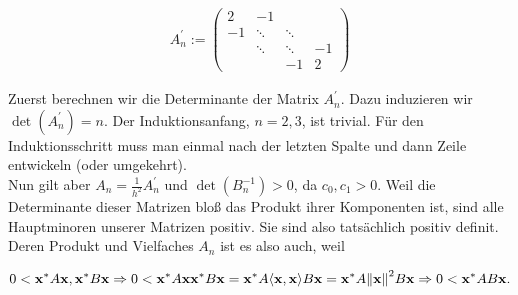 \begin{align*}
  A_n^\prime :=
  \begin{pmatrix}
     2 &  -1     &        &    \\
    -1 &  \ddots & \ddots &    \\
       &  \ddots & \ddots & -1 \\
       &         & -1     &  2
  \end{pmatrix}
\end{align*}

Zuerst berechnen wir die Determinante der Matrix $A_n^\prime$. Dazu induzieren wir $\det(A_n^\prime) = n$. Der Induktionsanfang, $n = 2, 3$, ist trivial. Für den Induktionsschritt muss man einmal nach der letzten Spalte und dann Zeile entwickeln (oder umgekehrt). \\

Nun gilt aber $A_n = \frac{1}{h^2} A_n^\prime$ und $\det(B_n^{-1}) > 0$, da $c_0, c_1 > 0$. Weil die Determinante dieser Matrizen bloß das Produkt ihrer Komponenten ist, sind alle Hauptminoren unserer Matrizen positiv. Sie sind also tatsächlich positiv definit. Deren Produkt und Vielfaches $A_n$ ist es also auch, weil

\begin{align*}
  0 < \mathbf{x}^\ast A \mathbf{x}, \mathbf{x}^\ast B \mathbf{x}
  \Rightarrow
  0 < \mathbf{x}^\ast A \mathbf{x} \mathbf{x}^\ast B \mathbf{x} =
  \mathbf{x}^\ast A {\left < \mathbf{x}, \mathbf{x} \right >} B \mathbf{x} =
  \mathbf{x}^\ast A {\left \| \mathbf{x} \right \|}_{}^2 B \mathbf{x}
  \Rightarrow
  0 < \mathbf{x}^\ast AB \mathbf{x}.
\end{align*}

\newpage
